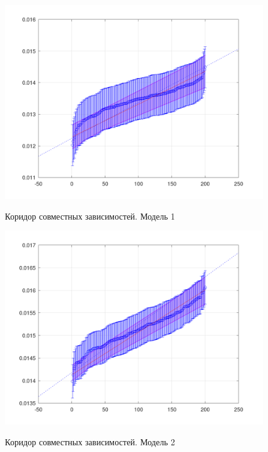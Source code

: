 \begin{figure}[H]
	\begin{center}
		\includegraphics[scale=0.32]{joint_depth_1}
		\label{pic:joint_depth1}
		\caption{Коридор совместных зависимостей. Модель 1}
	\end{center}
\end{figure}

\begin{figure}[H]
	\begin{center}
		\includegraphics[scale=0.32]{joint_depth_2}
		\label{pic:joint_depth2}
		\caption{Коридор совместных зависимостей. Модель 2}
	\end{center}
\end{figure}

